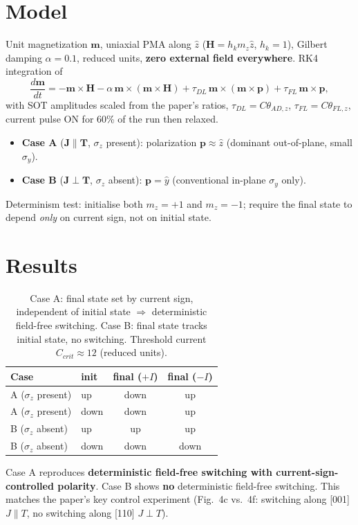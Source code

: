 \documentclass[11pt]{article}
\begin{document}
\section{Model}
Unit magnetization $\mathbf{m}$, uniaxial PMA along $\hat z$
($\mathbf{H}=h_k m_z\hat z$, $h_k=1$), Gilbert damping $\alpha=0.1$, reduced units,
\textbf{zero external field everywhere}. RK4 integration of
\[
\frac{d\mathbf{m}}{dt}=-\mathbf{m}\times\mathbf{H}
-\alpha\,\mathbf{m}\times(\mathbf{m}\times\mathbf{H})
+\tau_{DL}\,\mathbf{m}\times(\mathbf{m}\times\mathbf{p})
+\tau_{FL}\,\mathbf{m}\times\mathbf{p},
\]
with SOT amplitudes scaled from the paper's ratios, $\tau_{DL}=C\theta_{AD,z}$,
$\tau_{FL}=C\theta_{FL,z}$, current pulse ON for 60\% of the run then relaxed.
\begin{itemize}
\item \textbf{Case A} ($\mathbf{J}\parallel\mathbf{T}$, $\sigma_z$ present): polarization
$\mathbf{p}\approx\hat z$ (dominant out-of-plane, small $\sigma_y$).
\item \textbf{Case B} ($\mathbf{J}\perp\mathbf{T}$, $\sigma_z$ absent): $\mathbf{p}=\hat y$
(conventional in-plane $\sigma_y$ only).
\end{itemize}
Determinism test: initialise both $m_z=+1$ and $m_z=-1$; require the final state to depend
\emph{only} on current sign, not on initial state.

\section{Results}
\begin{table}[h]\centering
\begin{tabular}{llcc}
\toprule
Case & init & final ($+I$) & final ($-I$)\\
\midrule
A ($\sigma_z$ present) & up   & down & up\\
A ($\sigma_z$ present) & down & down & up\\
B ($\sigma_z$ absent)  & up   & up   & up\\
B ($\sigma_z$ absent)  & down & down & down\\
\bottomrule
\end{tabular}
\caption{Case A: final state set by current sign, independent of initial state
$\Rightarrow$ deterministic field-free switching. Case B: final state tracks initial state,
no switching. Threshold current $C_{crit}\approx 12$ (reduced units).}
\end{table}

Case A reproduces \textbf{deterministic field-free switching with current-sign-controlled
polarity}. Case B shows \textbf{no} deterministic field-free switching. This matches the
paper's key control experiment (Fig.~4c vs.~4f: switching along [001] $J\parallel T$,
no switching along [110] $J\perp T$).
\end{document}
